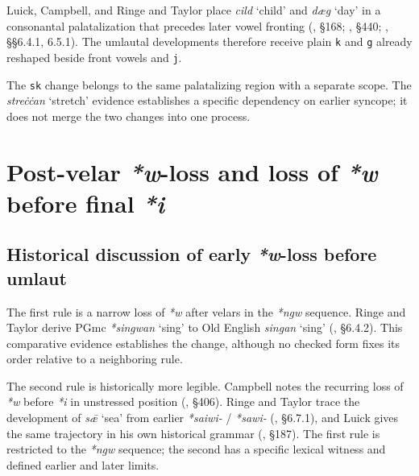 \documentclass[
  british,
  a4paper,
  openany]{book}
\providecommand{\Recon}[1]{\emph{*#1}}
{\catcode`→=\active \global\def→{\ensuremath{\rightarrow}}}
\providecommand{\texorpdfstring}[2]{#1}
\providecommand{\Recon}[1]{\emph{*#1}}
{\catcode`→=\active \global\def→{\ensuremath{\rightarrow}}}
\begin{document}
Luick, Campbell, and Ringe and Taylor place \emph{cild} `child' and
\emph{dæg} `day' in a consonantal palatalization that precedes later
vowel fronting (, §168;
, §440;
, §§6.4.1,
6.5.1). The umlautal developments therefore receive plain \texttt{k} and
\texttt{g} already reshaped beside front vowels and \texttt{j}.

The \texttt{sk} change belongs to the same palatalizing region with a
separate scope. The \emph{streċċan} `stretch' evidence establishes a
specific dependency on earlier syncope; it does not merge the two
changes into one process.

\newpage

\section{\texorpdfstring{Post-velar \emph{*w}-loss and loss of \emph{*w}
before final
\emph{*i}}{Post-velar -loss and loss of  before final }}\label{post-velar--loss-and-loss-of-before-final}

\subsection{\texorpdfstring{Historical discussion of early
\emph{*w}-loss before
umlaut}{Historical discussion of early -loss before umlaut}}\label{historical-discussion-of-early--loss-before-umlaut}

The first rule is a narrow loss of \emph{*w} after velars in the
\emph{*ngw} sequence. Ringe and Taylor derive PGmc \Recon{singwan}
`sing' to Old English \emph{singan} `sing'
(, §6.4.2).
This comparative evidence establishes the change, although no checked
form fixes its order relative to a neighboring rule.

The second rule is historically more legible. Campbell notes the
recurring loss of \emph{*w} before \emph{*i} in unstressed position
(, §406). Ringe and
Taylor trace the development of \emph{sǣ} `sea' from earlier
\emph{*saiwi-} / \emph{*sawi-} (, §6.7.1), and Luick gives the same trajectory in his
own historical grammar (, §187). The first rule is restricted to the \emph{*ngw} sequence;
the second has a specific lexical witness and defined earlier and later
limits.
\end{document}
